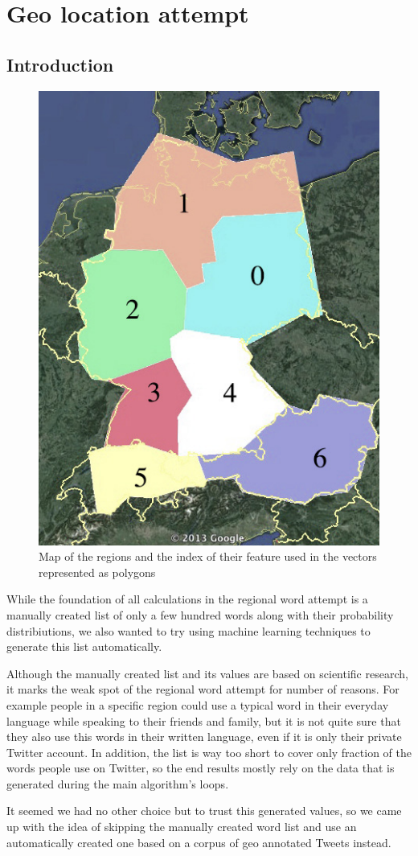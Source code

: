 \documentclass[../Main.tex]{subfiles}
\begin{document}
\section{Geo location attempt }
\subsection{Introduction}
\begin{figure}
  \begin{center}
   \includegraphics[width=0.5\columnwidth]{../img/polygone_satt.jpg}
    \caption{\label{geo_polymap} Map of the regions and the index of their feature used in the vectors represented as polygons}
  \end{center}
\end{figure}
While the foundation of all calculations in the regional word attempt is a manually created list of only a few hundred words along with their probability distribiutions, we also wanted to try using machine learning techniques to generate this list automatically.

Although the manually created list and its values are based on scientific research, it marks the weak spot of the regional word attempt for number of reasons. For example people in a specific region could use a typical word in their everyday language while speaking to their friends and family, but it is not quite sure that they also use this words in their written language, even if it is only their private Twitter account. In addition, the list is way too short to cover only fraction of the words people use on Twitter, so the end results mostly rely on the data that is generated during the main algorithm's loops.

It seemed we had no other choice but to trust this generated values, so we came up with the idea of skipping the manually created word list and use an automatically created one based on a corpus of geo annotated Tweets instead.
\end{document}
